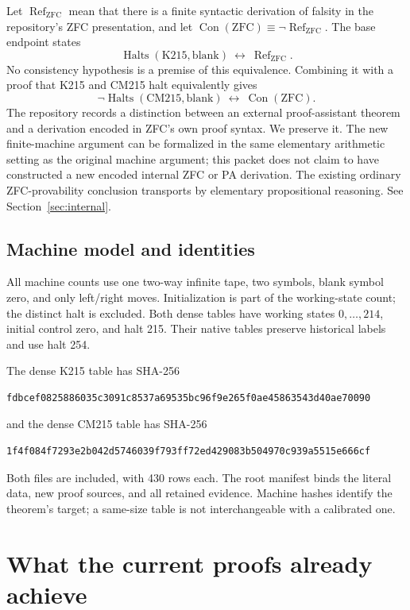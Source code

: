 \documentclass[11pt,letterpaper]{article}
\theoremstyle{definition}
\newcommand{\Halts}{\operatorname{Halts}}
\newcommand{\Con}{\operatorname{Con}}
\newcommand{\Refute}{\operatorname{Ref}}
\newcommand{\ZFC}{\mathrm{ZFC}}
\newcommand{\K}{\mathrm{K215}}
\newcommand{\CM}{\mathrm{CM215}}
\begin{document}
Let $\Refute_{\ZFC}$ mean that there is a finite syntactic derivation of
falsity in the repository's ZFC presentation, and let
$\Con(\ZFC)\equiv\neg\Refute_{\ZFC}$. The base endpoint states
\[
 \Halts(\K,\mathrm{blank})\ \longleftrightarrow\ \Refute_{\ZFC}.
\]
No consistency hypothesis is a premise of this equivalence. Combining it
with a proof that K215 and CM215 halt equivalently gives
\[
 \neg\Halts(\CM,\mathrm{blank})\ \longleftrightarrow\ \Con(\ZFC).
\]
The repository records a distinction between an external proof-assistant
theorem and a derivation encoded in ZFC's own proof syntax. We preserve it.
The new finite-machine argument can be formalized in the same elementary
arithmetic setting as the original machine argument; this packet does not
claim to have constructed a new encoded internal ZFC or PA derivation.
The existing ordinary ZFC-provability conclusion transports by elementary
propositional reasoning. See Section~\ref{sec:internal}.

\subsection{Machine model and identities}

All machine counts use one two-way infinite tape, two symbols, blank
symbol zero, and only left/right moves. Initialization is part of the
working-state count; the distinct halt is excluded. Both dense tables have
working states $0,\ldots,214$, initial control zero, and halt 215. Their
native tables preserve historical labels and use halt 254.

The dense K215 table has SHA-256
\begin{lstlisting}
fdbcef0825886035c3091c8537a69535bc96f9e265f0ae45863543d40ae70090
\end{lstlisting}
and the dense CM215 table has SHA-256
\begin{lstlisting}
1f4f084f7293e2b042d5746039f793ff72ed429083b504970c939a5515e666cf
\end{lstlisting}
Both files are included, with 430 rows each. The root manifest binds the
literal data, new proof sources, and all retained evidence. Machine hashes
identify the theorem's target; a same-size table is not interchangeable
with a calibrated one.

\section{What the current proofs already achieve}
\end{document}
